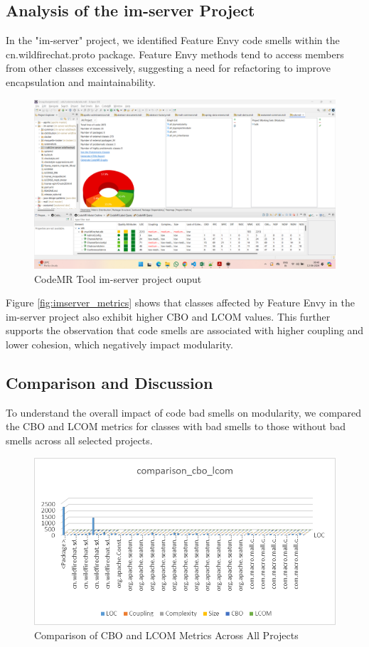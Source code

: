 \documentclass[conference]{IEEEtran}
\begin{document}
\subsection{Analysis of the im-server Project}

In the "im-server" project, we identified Feature Envy code smells within the cn.wildfirechat.proto package. Feature Envy methods tend to access members from other classes excessively, suggesting a need for refactoring to improve encapsulation and maintainability.

\begin{figure}
    \centering
    \includegraphics[width=0.75\linewidth]{im-server-sdk-output-CodeMRTool.png}
    \caption{CodeMR Tool im-server project ouput}
    \label{fig:enter-label}
\end{figure}
       

Figure \ref{fig:imserver_metrics} shows that classes affected by Feature Envy in the im-server project also exhibit higher CBO and LCOM values. This further supports the observation that code smells are associated with higher coupling and lower cohesion, which negatively impact modularity.

\subsection{Comparison and Discussion}

To understand the overall impact of code bad smells on modularity, we compared the CBO and LCOM metrics for classes with bad smells to those without bad smells across all selected projects.

\begin{figure}
    \centering
    \includegraphics[width=0.75\linewidth]{Comparison_cbo_lcom.png}
    \caption{Comparison of CBO and LCOM Metrics Across All Projects}
    \label{fig:comparison_metrics}
\end{figure}
\end{document}
